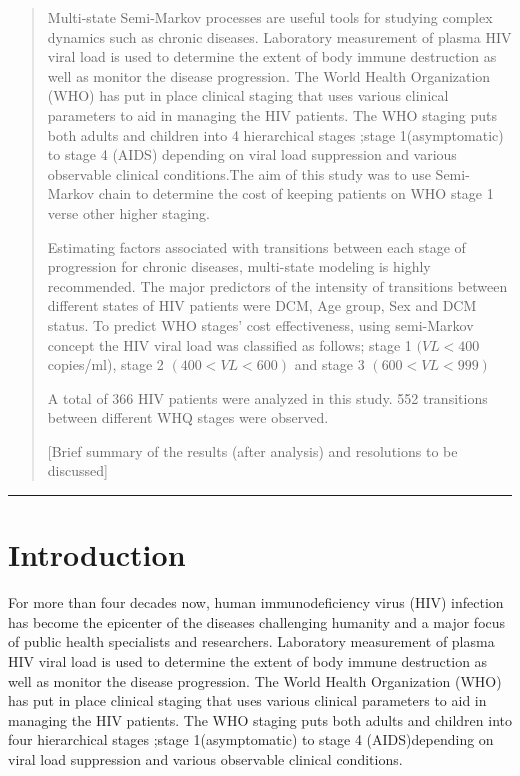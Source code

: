 \documentclass[11pt]{article}
\begin{document}
	\begin{abstract}
		\noindent Multi-state Semi-Markov processes are useful tools for studying complex dynamics such as chronic diseases. Laboratory measurement of plasma HIV viral load is used to determine the extent of body immune destruction as well as monitor the disease progression. The World Health Organization (WHO) has put in place clinical staging that uses various clinical parameters to aid in managing the HIV patients. The WHO staging puts both adults and children into 4 hierarchical stages ;stage 1(asymptomatic) to stage 4 (AIDS) depending on viral load suppression and various observable clinical conditions.The aim of this study was to use Semi-Markov chain to determine the cost of keeping patients on WHO stage 1 verse other higher staging.\vspace*{2mm}
		
		\noindent Estimating factors associated with transitions between each stage of progression for chronic diseases, multi-state modeling is highly recommended. The major predictors of the intensity of transitions between different states of HIV patients were DCM, Age group, Sex and DCM status. To predict WHO stages’ cost effectiveness, using semi-Markov concept the HIV viral load was classified as follows; stage 1 $(VL <400$ copies/ml), stage 2 $(400< VL <600)$ and stage 3 $(600<VL< 999)$\vspace*{2mm}
		
		A total of 366 HIV patients were analyzed in this study. 552 transitions between different WHQ stages were observed.
		
		[Brief summary of the results (after analysis) and resolutions to be discussed]
		
	\end{abstract}
	\rule{\textwidth}{0.4pt}
	
	
	\section{Introduction}\label{introduction}
	For more than four decades now, human immunodeficiency virus (HIV) infection has become the epicenter of the diseases challenging humanity and a major focus of public health specialists and researchers. Laboratory measurement of plasma HIV viral load is used to determine the extent of body immune destruction as well as monitor the disease progression. The World Health Organization (WHO) has put in place clinical staging that uses various clinical parameters to aid in managing the HIV patients. The WHO staging puts both adults and children into four hierarchical stages ;stage 1(asymptomatic) to stage 4 (AIDS)depending on viral load suppression and various observable clinical conditions.\\
	
\end{document}
